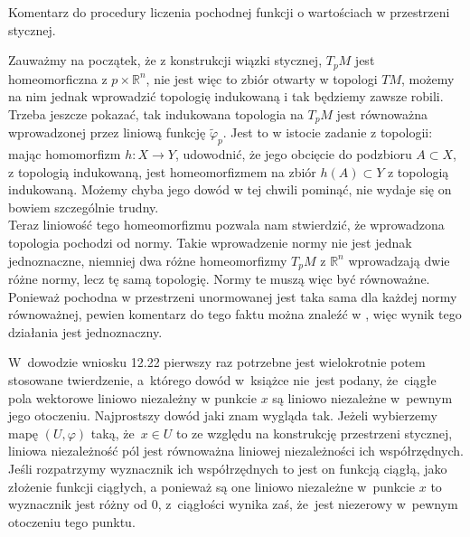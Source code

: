 \documentclass[a4paper,11pt]{article}
\begin{document}
\vspace{\spaceFour}


\start Komentarz do procedury liczenia pochodnej funkcji o wartościach
w przestrzeni stycznej.

Zauważmy na początek, że z konstrukcji wiązki stycznej, $T_{ p }M$
jest homeomorficzna z $p \times \mathbb{R}^{ n }$, nie jest więc to
zbiór otwarty w topologi $TM$, możemy na nim jednak wprowadzić
topologię indukowaną i tak będziemy zawsze robili. Trzeba jeszcze
pokazać, tak indukowana topologia na $T_{ p }M$ jest równoważna
wprowadzonej przez liniową funkcję $\widetilde{ \varphi }_{ p }$. Jest
to w istocie zadanie z topologii: mając homomorfizm $h : X \to Y$,
udowodnić,
że jego obcięcie do podzbioru $A \subset X$, z topologią indukowaną, jest homeomorfizmem na zbiór $h( A ) \subset Y$ z topologią indukowaną. Możemy chyba jego dowód w tej chwili pominąć, nie wydaje się on bowiem szczególnie trudny. \\
Teraz liniowość tego homeomorfizmu pozwala nam stwierdzić, że
wprowadzona topologia pochodzi od normy. Takie wprowadzenie normy nie
jest jednak jednoznaczne, niemniej dwa różne homeomorfizmy $T_{ p }M$
z $\mathbb{R}^{ n }$ wprowadzają dwie różne normy, lecz tę samą
topologię. Normy te muszą więc być równoważne. Ponieważ pochodna w
przestrzeni unormowanej jest taka sama dla każdej normy równoważnej,
pewien komentarz do tego faktu można znaleźć w \cite{Sch79}, więc
wynik tego działania jest jednoznaczny.

\vspace{\spaceFour}


\start {} W~dowodzie wniosku 12.22 pierwszy raz potrzebne jest
wielokrotnie potem stosowane twierdzenie, a~którego dowód w~książce
nie~jest podany, że~ciągłe pola wektorowe liniowo niezależny w punkcie
$x$ są liniowo niezależne w~pewnym jego otoczeniu. Najprostszy dowód
jaki znam wygląda tak. Jeżeli wybierzemy mapę $( U, \varphi )$ taką,
że~$x \in U$ to ze względu na konstrukcję przestrzeni stycznej,
liniowa niezależność pól jest równoważna liniowej niezależności ich
współrzędnych. Jeśli rozpatrzymy wyznacznik ich współrzędnych to jest
on funkcją ciągłą, jako złożenie funkcji ciągłych, a ponieważ są one
liniowo niezależne w~punkcie $x$ to wyznacznik jest różny od 0,
z~ciągłości wynika zaś, że~jest niezerowy w~pewnym otoczeniu tego
punktu.
\end{document}
